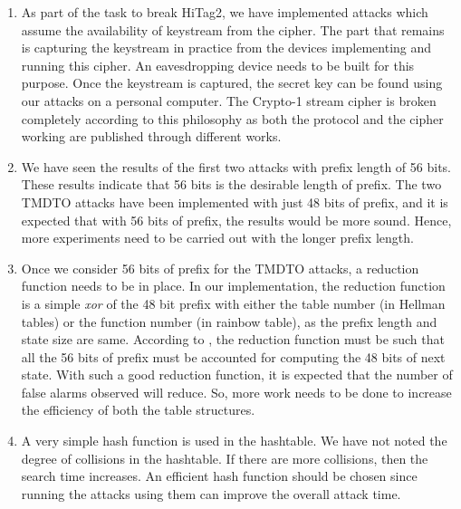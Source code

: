 \begin{enumerate}
\item As part of the task to break HiTag2, we have implemented attacks which assume the availability of keystream from the cipher. The part that remains is capturing the keystream in practice from the devices implementing and running this cipher. An eavesdropping device needs to be built for this purpose. Once the keystream is captured, the secret key can be found using our attacks on a personal computer. The Crypto-1 stream cipher is broken completely according to this philosophy as both the protocol and the cipher working are published through different works. 

\item We have seen the results of the first two attacks with prefix length of 56 bits. These results indicate that 56 bits is the desirable length of prefix. The two TMDTO attacks have been implemented with just 48 bits of prefix, and it is expected that with 56 bits of prefix, the results would be more sound. Hence, more experiments need to be carried out with the longer prefix length.

\item Once we consider 56 bits of prefix for the TMDTO attacks, a reduction function needs to be in place. In our implementation, the reduction function is a simple \textit{xor} of the 48 bit prefix with either the table number (in Hellman tables) or the function number (in rainbow table), as the prefix length and state size are same. According to \cite{email-karsten}, the reduction function must be such that all the 56 bits of prefix must be accounted for computing the 48 bits of next state. With such a good reduction function, it is expected that the number of false alarms observed will reduce. So, more work needs to be done to increase the efficiency of both the table structures.

\item A very simple hash function is used in the hashtable. We have not noted the degree of collisions in the hashtable. If there are more collisions, then the search time increases. An efficient hash function should be chosen since running the attacks using them can improve the overall attack time. 
\end{enumerate}